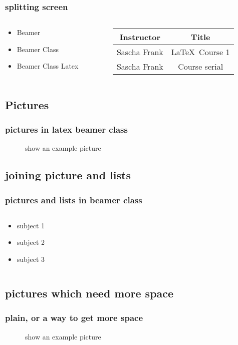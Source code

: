 \documentclass{beamer}
\begin{document}
\begin{frame}\frametitle{splitting screen}
\begin{columns}
\begin{column}{5cm}
\begin{itemize}
\item Beamer
\item Beamer Class
\item Beamer Class Latex
\end{itemize}
\end{column}
\begin{column}{5cm}
\begin{tabular}{|c|c|}
\hline
\textbf{Instructor} & \textbf{Title} \\
\hline
Sascha Frank &  \LaTeX \ Course 1 \\
\hline
Sascha Frank &  Course serial  \\
\hline
\end{tabular}
\end{column}
\end{columns}
\end{frame}

\subsection{Pictures}
\begin{frame}\frametitle{pictures in latex beamer class}
\begin{figure}
\caption{show an example picture}
\end{figure}
\end{frame}

\subsection{joining picture and lists}

\begin{frame}
\frametitle{pictures and lists in beamer class}
\begin{columns}
\begin{column}{5cm}
\begin{itemize}
\item<1-> subject 1
\item<3-> subject 2
\item<5-> subject 3
\end{itemize}
\vspace{3cm}
\end{column}
\begin{column}{5cm}
\begin{overprint}
\end{overprint}
\end{column}
\end{columns}
\end{frame}


\subsection{pictures which need more space}
\begin{frame}[plain]
\frametitle{plain, or a way to get more space}
\begin{figure}
\caption{show an example picture}
\end{figure}
\end{frame}
\end{document}
